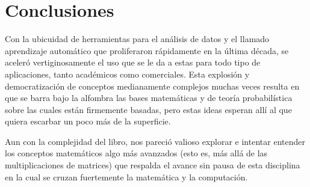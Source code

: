 \documentclass[12pt]{extarticle}
\newenvironment{comentarios_meta}
    {\begin{framed}\noindent\textcolor{red}{\textbf{\#}}}
    {\end{framed}}
\begin{document}
\section{Conclusiones}

    Con la ubicuidad de herramientas para el análisis de datos y el llamado aprendizaje automático que proliferaron rápidamente en la última década, se aceleró vertiginosamente el uso que se le da a estas para todo tipo de aplicaciones, tanto académicos como comerciales. Esta explosión y democratización de conceptos medianamente complejos muchas veces resulta en que se barra bajo la alfombra las bases matemáticas y de teoría probabilística sobre las cuales están firmemente basadas, pero estas ideas esperan allí al que quiera escarbar un poco más de la superficie.
    
    Aun con la complejidad del libro, nos pareció valioso explorar e intentar entender los conceptos matemáticos algo más avanzados (esto es, más allá de las multiplicaciones de matrices) que respalda el avance sin pausa de esta disciplina en la cual se cruzan fuertemente la matemática y la computación.


% 
% 


\end{document}
